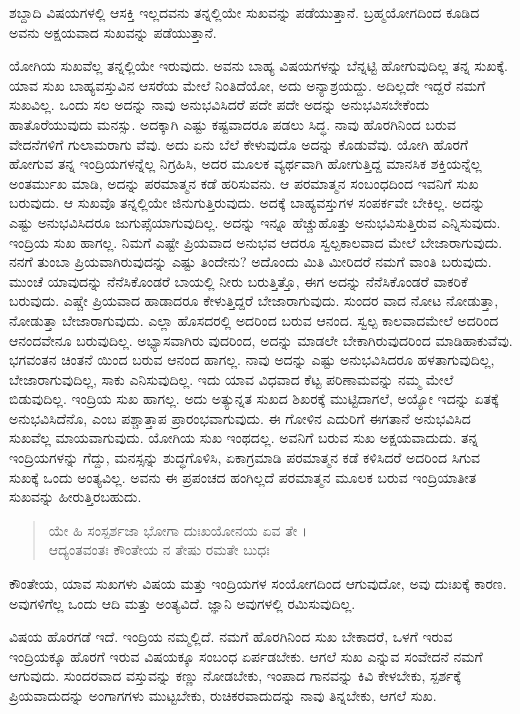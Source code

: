 {\small ಶಬ್ದಾದಿ ವಿಷಯಗಳಲ್ಲಿ ಆಸಕ್ತಿ ಇಲ್ಲದವನು ತನ್ನಲ್ಲಿಯೇ ಸುಖವನ್ನು ಪಡೆಯುತ್ತಾನೆ. ಬ್ರಹ್ಮಯೋಗದಿಂದ ಕೂಡಿದ ಅವನು ಅಕ್ಷಯವಾದ ಸುಖವನ್ನು ಪಡೆಯುತ್ತಾನೆ.}

ಯೋಗಿಯ ಸುಖವೆಲ್ಲ ತನ್ನಲ್ಲಿಯೇ ಇರುವುದು. ಅವನು ಬಾಹ್ಯ ವಿಷಯಗಳನ್ನು ಬೆನ್ನಟ್ಟಿ ಹೋಗುವುದಿಲ್ಲ ತನ್ನ ಸುಖಕ್ಕೆ. ಯಾವ ಸುಖ ಬಾಹ್ಯವಸ್ತುವಿನ ಆಸರೆಯ ಮೇಲೆ ನಿಂತಿದೆಯೋ, ಅದು ಅನ್ಯಾಶ್ರಯದ್ದು. ಅದಿಲ್ಲದೇ ಇದ್ದರೆ ನಮಗೆ ಸುಖವಿಲ್ಲ. ಒಂದು ಸಲ ಅದನ್ನು ನಾವು ಅನುಭವಿಸಿದರೆ ಪದೇ ಪದೇ ಅದನ್ನು ಅನುಭವಿಸಬೇಕೆಂದು ಹಾತೊರೆಯುವುದು ಮನಸ್ಸು. ಅದಕ್ಕಾಗಿ ಎಷ್ಟು ಕಷ್ಟವಾದರೂ ಪಡಲು ಸಿದ್ಧ. ನಾವು ಹೊರಗಿನಿಂದ ಬರುವ ವೇದನೆಗಳಿಗೆ ಗುಲಾಮರಾಗು ವೆವು. ಅದು ಏನು ಬೆಲೆ ಕೇಳುವುದೊ ಅದನ್ನು ಕೊಡುವೆವು. ಯೋಗಿ ಹೊರಗೆ ಹೋಗುವ ತನ್ನ ಇಂದ್ರಿಯಗಳನ್ನೆಲ್ಲ ನಿಗ್ರಹಿಸಿ, ಅದರ ಮೂಲಕ ವ್ಯರ್ಥವಾಗಿ ಹೋಗುತ್ತಿದ್ದ ಮಾನಸಿಕ ಶಕ್ತಿಯನ್ನೆಲ್ಲ ಅಂತರ್ಮುಖ ಮಾಡಿ, ಅದನ್ನು ಪರಮಾತ್ಮನ ಕಡೆ ಹರಿಸುವನು. ಆ ಪರಮಾತ್ಮನ ಸಂಬಂಧದಿಂದ ಇವನಿಗೆ ಸುಖ ಬರುವುದು. ಆ ಸುಖವೊ ತನ್ನಲ್ಲಿಯೇ ಜಿನುಗುತ್ತಿರುವುದು. ಅದಕ್ಕೆ ಬಾಹ್ಯವಸ್ತುಗಳ ಸಂಪರ್ಕವೇ ಬೇಕಿಲ್ಲ. ಅದನ್ನು ಎಷ್ಟು ಅನುಭವಿಸಿದರೂ ಜುಗುಪ್ಸೆಯಾಗುವುದಿಲ್ಲ. ಅದನ್ನು ಇನ್ನೂ ಹೆಚ್ಚುಹೊತ್ತು ಅನುಭವಿಸುತ್ತಿರುವ ಎನ್ನಿಸುವುದು. ಇಂದ್ರಿಯ ಸುಖ ಹಾಗಲ್ಲ. ನಿಮಗೆ ಎಷ್ಟೇ ಪ್ರಿಯವಾದ ಅನುಭವ ಆದರೂ ಸ್ವಲ್ಪಕಾಲವಾದ ಮೇಲೆ ಬೇಜಾರಾಗುವುದು. ನನಗೆ ತುಂಬಾ ಪ್ರಿಯವಾಗಿರುವುದನ್ನು ಎಷ್ಟು ತಿಂದೇನು? ಅದೊಂದು ಮಿತಿ ಮೀರಿದರೆ ನಮಗೆ ವಾಂತಿ ಬರುವುದು. ಮುಂಚೆ ಯಾವುದನ್ನು ನೆನೆಸಿಕೊಂಡರೆ ಬಾಯಲ್ಲಿ ನೀರು ಬರುತ್ತಿತ್ತೊ, ಈಗ ಅದನ್ನು ನೆನೆಸಿಕೊಂಡರೆ ವಾಕರಿಕೆ ಬರುವುದು. ಎಷ್ಚೇ ಪ್ರಿಯವಾದ ಹಾಡಾದರೂ ಕೇಳುತ್ತಿದ್ದರೆ ಬೇಜಾರಾಗುವುದು. ಸುಂದರ ವಾದ ನೋಟ ನೋಡುತ್ತಾ, ನೋಡುತ್ತಾ ಬೇಜಾರಾಗುವುದು. ಎಲ್ಲಾ ಹೊಸದರಲ್ಲಿ ಅದರಿಂದ ಬರುವ ಆನಂದ. ಸ್ವಲ್ಪ ಕಾಲವಾದಮೇಲೆ ಅದರಿಂದ ಆನಂದವೇನೂ ಬರುವುದಿಲ್ಲ. ಅಭ್ಯಾಸವಾಗಿರು ವುದರಿಂದ, ಅದನ್ನು ಮಾಡಲೇ ಬೇಕಾಗಿರುವುದರಿಂದ ಮಾಡಿಹಾಕುವೆವು. ಭಗವಂತನ ಚಿಂತನೆ ಯಿಂದ ಬರುವ ಆನಂದ ಹಾಗಲ್ಲ. ನಾವು ಅದನ್ನು ಎಷ್ಟು ಅನುಭವಿಸಿದರೂ ಹಳತಾಗುವುದಿಲ್ಲ, ಬೇಜಾರಾಗುವುದಿಲ್ಲ, ಸಾಕು ಎನಿಸುವುದಿಲ್ಲ. ಇದು ಯಾವ ವಿಧವಾದ ಕೆಟ್ಟ ಪರಿಣಾಮವನ್ನು ನಮ್ಮ ಮೇಲೆ ಬಿಡುವುದಿಲ್ಲ. ಇಂದ್ರಿಯ ಸುಖ ಹಾಗಲ್ಲ. ಅದು ಅತ್ಯುನ್ನತ ಸುಖದ ಶಿಖರಕ್ಕೆ ಮುಟ್ಟಿದಾಗಲೆ, ಅಯ್ಯೋ ಇದನ್ನು ಏತಕ್ಕೆ ಅನುಭವಿಸಿದೆನೊ, ಎಂಬ ಪಶ್ಚಾತ್ತಾಪ ಪ್ರಾರಂಭವಾಗುವುದು. ಈ ಗೋಳಿನ ಎದುರಿಗೆ ಈಗತಾನೆ ಅನುಭವಿಸಿದ ಸುಖವೆಲ್ಲ ಮಾಯವಾಗುವುದು. ಯೋಗಿಯ ಸುಖ ಇಂಥದಲ್ಲ. ಅವನಿಗೆ ಬರುವ ಸುಖ ಅಕ್ಷಯವಾದುದು. ತನ್ನ ಇಂದ್ರಿಯಗಳನ್ನು ಗೆದ್ದು, ಮನಸ್ಸನ್ನು ಶುದ್ಧಗೊಳಿಸಿ, ಏಕಾಗ್ರಮಾಡಿ ಪರಮಾತ್ಮನ ಕಡೆ ಕಳಿಸಿದರೆ ಅದರಿಂದ ಸಿಗುವ ಸುಖಕ್ಕೆ ಒಂದು ಅಂತ್ಯವಿಲ್ಲ. ಅವನು ಈ ಪ್ರಪಂಚದ ಹಂಗಿಲ್ಲದೆ ಪರಮಾತ್ಮನ ಮೂಲಕ ಬರುವ ಇಂದ್ರಿಯಾತೀತ ಸುಖವನ್ನು ಹೀರುತ್ತಿರಬಹುದು.

\begin{verse}
ಯೇ ಹಿ ಸಂಸ್ಪರ್ಶಜಾ ಭೋಗಾ ದುಃಖಯೋನಯ ಏವ ತೇ ।\\ಆದ್ಯಂತವಂತಃ ಕೌಂತೇಯ ನ ತೇಷು ರಮತೇ ಬುಧಃ 
\end{verse}

{\small ಕೌಂತೇಯ, ಯಾವ ಸುಖಗಳು ವಿಷಯ ಮತ್ತು ಇಂದ್ರಿಯಗಳ ಸಂಯೋಗದಿಂದ ಆಗುವುದೋ, ಅವು ದುಃಖಕ್ಕೆ ಕಾರಣ. ಅವುಗಳಿಗೆಲ್ಲ ಒಂದು ಆದಿ ಮತ್ತು ಅಂತ್ಯವಿದೆ. ಜ್ಞಾನಿ ಅವುಗಳಲ್ಲಿ ರಮಿಸುವುದಿಲ್ಲ.}

ವಿಷಯ ಹೊರಗಡೆ ಇದೆ. ಇಂದ್ರಿಯ ನಮ್ಮಲ್ಲಿದೆ. ನಮಗೆ ಹೊರಗಿನಿಂದ ಸುಖ ಬೇಕಾದರೆ, ಒಳಗೆ ಇರುವ ಇಂದ್ರಿಯಕ್ಕೂ ಹೊರಗೆ ಇರುವ ವಿಷಯಕ್ಕೂ ಸಂಬಂಧ ಏರ್ಪಡಬೇಕು. ಆಗಲೆ ಸುಖ ಎನ್ನುವ ಸಂವೇದನೆ ನಮಗೆ ಆಗುವುದು. ಸುಂದರವಾದ ವಸ್ತುವನ್ನು ಕಣ್ಣು ನೋಡಬೇಕು, ಇಂಪಾದ ಗಾನವನ್ನು ಕಿವಿ ಕೇಳಬೇಕು, ಸ್ಪರ್ಶಕ್ಕೆ ಪ್ರಿಯವಾದುದನ್ನು ಅಂಗಾಗಗಳು ಮುಟ್ಟಬೇಕು, ರುಚಿಕರವಾದುದನ್ನು ನಾವು ತಿನ್ನಬೇಕು, ಆಗಲೆ ಸುಖ.


